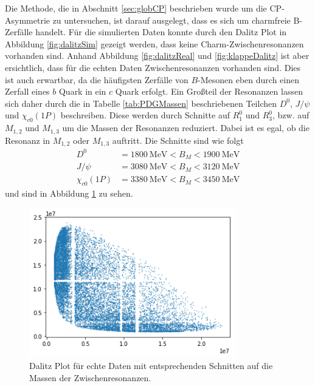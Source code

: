 Die Methode, die in Abschnitt \ref{sec:globCP} beschrieben wurde um die CP-Asymmetrie zu untersuchen, ist darauf ausgelegt, dass es sich um charmfreie B-Zerfälle handelt.
Für die simulierten Daten konnte durch den Dalitz Plot in Abbildung \ref{fig:dalitzSim} gezeigt werden, dass keine Charm-Zwischenresonanzen vorhanden sind.
Anhand Abbildung \ref{fig:dalitzReal} und \ref{fig:klappeDalitz} ist aber ersichtlich, dass für die echten Daten Zwischenresonanzen vorhanden sind.
Dies ist auch erwartbar, da die häufigsten Zerfälle von $B$-Mesonen eben durch einen Zerfall eines $b$ Quark in ein $c$ Quark erfolgt.
Ein Großteil der Resonanzen lassen sich daher durch die in Tabelle \ref{tab:PDGMassen} beschriebenen Teilchen $D^0$, $J/\psi$ und $\chi_{c0}\left(1P\right)$ beschreiben.
Diese werden durch Schnitte auf $R_1^0$ und $R_3^0$, bzw. auf $M_{1,2}$ und $M_{1,3}$ um die Massen der Resonanzen reduziert.
Dabei ist es egal, ob die Resonanz in $M_{1,2}$ oder $M_{1,3}$ auftritt.
Die Schnitte sind wie folgt
\begin{align*}
  D^0 &= \SI{1800}{\mega\electronvolt} < B_M < \SI{1900}{\mega\electronvolt}  \\
  J/\psi &= \SI{3080}{\mega\electronvolt} < B_M < \SI{3120}{\mega\electronvolt} \\
  \chi_{c0}\left(1P\right) &= \SI{3380}{\mega\electronvolt} < B_M < \SI{3450}{\mega\electronvolt}
\end{align*}
und sind in Abbildung \ref{fig:schnibbelDalitz} zu sehen.

\begin{figure}
  \centering
  \includegraphics[width=0.8\textwidth]{plots/real_data_dalitz_removed_resonances.png}
  \caption{Dalitz Plot für echte Daten mit entsprechenden Schnitten auf die Massen der Zwischenresonanzen.}
  \label{fig:schnibbelDalitz}
\end{figure}
